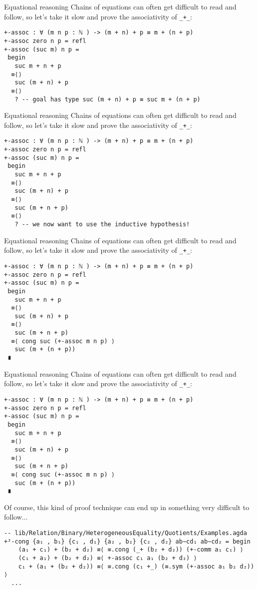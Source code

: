 \documentclass[t,aspectratio=169,9pt]{beamer}
\begin{document}
\begin{frame}{Equational reasoning}
  Chains of equations can often get difficult to read and follow, so let's take
  it slow and prove the associativity of \texttt{_+_}:
\begin{verbatim}
+-assoc : ∀ (m n p : ℕ ) -> (m + n) + p ≡ m + (n + p)
+-assoc zero n p = refl 
+-assoc (suc m) n p = 
 begin 
   suc m + n + p 
  ≡⟨⟩ 
   suc (m + n) + p 
  ≡⟨⟩ 
   ? -- goal has type suc (m + n) + p ≡ suc m + (n + p)
\end{verbatim}
\end{frame}

\begin{frame}{Equational reasoning}
  Chains of equations can often get difficult to read and follow, so let's take
  it slow and prove the associativity of \texttt{_+_}:
\begin{verbatim}
+-assoc : ∀ (m n p : ℕ ) -> (m + n) + p ≡ m + (n + p)
+-assoc zero n p = refl 
+-assoc (suc m) n p = 
 begin 
   suc m + n + p 
  ≡⟨⟩ 
   suc (m + n) + p 
  ≡⟨⟩ 
   suc (m + n + p)
  ≡⟨⟩ 
   ? -- we now want to use the inductive hypothesis!
\end{verbatim}
\end{frame}

\begin{frame}{Equational reasoning}
  Chains of equations can often get difficult to read and follow, so let's take
  it slow and prove the associativity of \texttt{_+_}:
\begin{verbatim}
+-assoc : ∀ (m n p : ℕ ) -> (m + n) + p ≡ m + (n + p)
+-assoc zero n p = refl 
+-assoc (suc m) n p = 
 begin 
   suc m + n + p 
  ≡⟨⟩ 
   suc (m + n) + p 
  ≡⟨⟩ 
   suc (m + n + p)
  ≡⟨ cong suc (+-assoc m n p) ⟩ 
   suc (m + (n + p))
 ∎
\end{verbatim}
\end{frame}

\begin{frame}{Equational reasoning}
  Chains of equations can often get difficult to read and follow, so let's take
  it slow and prove the associativity of \texttt{_+_}:
\begin{verbatim}
+-assoc : ∀ (m n p : ℕ ) -> (m + n) + p ≡ m + (n + p)
+-assoc zero n p = refl 
+-assoc (suc m) n p = 
 begin 
   suc m + n + p 
  ≡⟨⟩ 
   suc (m + n) + p 
  ≡⟨⟩ 
   suc (m + n + p)
  ≡⟨ cong suc (+-assoc m n p) ⟩ 
   suc (m + (n + p))
 ∎
\end{verbatim}

Of course, this kind of proof technique can end up in something very difficult
to follow...
\begin{verbatim}
-- lib/Relation/Binary/HeterogeneousEquality/Quotients/Examples.agda
+²-cong {a₁ , b₁} {c₁ , d₁} {a₂ , b₂} {c₂ , d₂} ab∼cd₁ ab∼cd₂ = begin
    (a₁ + c₁) + (b₂ + d₂) ≡⟨ ≡.cong (_+ (b₂ + d₂)) (+-comm a₁ c₁) ⟩
    (c₁ + a₁) + (b₂ + d₂) ≡⟨ +-assoc c₁ a₁ (b₂ + d₂) ⟩
    c₁ + (a₁ + (b₂ + d₂)) ≡⟨ ≡.cong (c₁ +_) (≡.sym (+-assoc a₁ b₂ d₂)) ⟩
  ...
\end{verbatim}
\end{frame}
\end{document}
